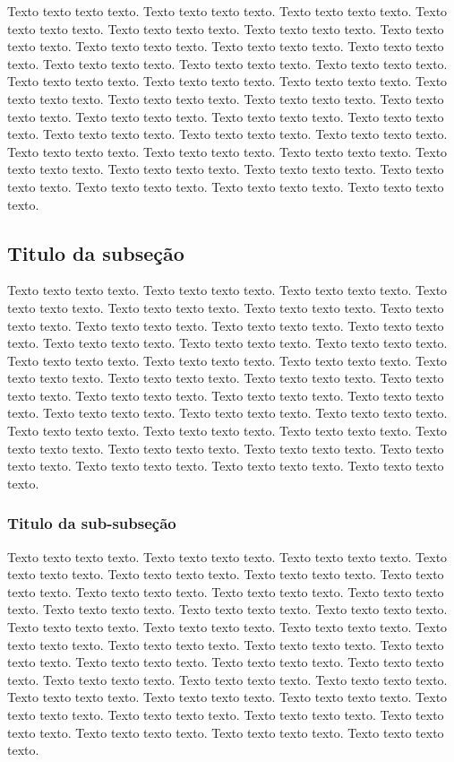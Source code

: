 \documentclass[a4paper, 12pt]{article}
\begin{document}
Texto texto texto texto. Texto texto texto texto. Texto texto texto texto. Texto texto texto texto.
Texto texto texto texto. Texto texto texto texto. Texto texto texto texto. Texto texto texto texto.
Texto texto texto texto. Texto texto texto texto. Texto texto texto texto. Texto texto texto texto.
Texto texto texto texto. Texto texto texto texto. Texto texto texto texto. Texto texto texto texto.
Texto texto texto texto. Texto texto texto texto. Texto texto texto texto. Texto texto texto texto.
Texto texto texto texto. Texto texto texto texto. Texto texto texto texto. Texto texto texto texto.
Texto texto texto texto. Texto texto texto texto. Texto texto texto texto. Texto texto texto texto.
Texto texto texto texto. Texto texto texto texto. Texto texto texto texto. Texto texto texto texto.
Texto texto texto texto. Texto texto texto texto. Texto texto texto texto. Texto texto texto texto.

	\subsection{Titulo da subseção}

	Texto texto texto texto. Texto texto texto texto. Texto texto texto texto. Texto texto texto texto.
	Texto texto texto texto. Texto texto texto texto. Texto texto texto texto. Texto texto texto texto.
	Texto texto texto texto. Texto texto texto texto. Texto texto texto texto. Texto texto texto texto.
	Texto texto texto texto. Texto texto texto texto. Texto texto texto texto. Texto texto texto texto.
	Texto texto texto texto. Texto texto texto texto. Texto texto texto texto. Texto texto texto texto.
	Texto texto texto texto. Texto texto texto texto. Texto texto texto texto. Texto texto texto texto.
	Texto texto texto texto. Texto texto texto texto. Texto texto texto texto. Texto texto texto texto.
	Texto texto texto texto. Texto texto texto texto. Texto texto texto texto. Texto texto texto texto.
	Texto texto texto texto. Texto texto texto texto. Texto texto texto texto. Texto texto texto texto.

		\subsubsection{Titulo da sub-subseção}

		Texto texto texto texto. Texto texto texto texto. Texto texto texto texto. Texto texto texto texto.
		Texto texto texto texto. Texto texto texto texto. Texto texto texto texto. Texto texto texto texto.
		Texto texto texto texto. Texto texto texto texto. Texto texto texto texto. Texto texto texto texto.
		Texto texto texto texto. Texto texto texto texto. Texto texto texto texto. Texto texto texto texto.
		Texto texto texto texto. Texto texto texto texto. Texto texto texto texto. Texto texto texto texto.
		Texto texto texto texto. Texto texto texto texto. Texto texto texto texto. Texto texto texto texto.
		Texto texto texto texto. Texto texto texto texto. Texto texto texto texto. Texto texto texto texto.
		Texto texto texto texto. Texto texto texto texto. Texto texto texto texto. Texto texto texto texto.
		Texto texto texto texto. Texto texto texto texto. Texto texto texto texto. Texto texto texto texto.
		
\end{document}
